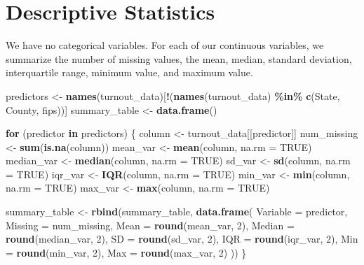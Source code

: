 \documentclass[
]{article}
\newenvironment{Shaded}{\begin{snugshade}}{\end{snugshade}}
\newcommand{\AttributeTok}[1]{\textcolor[rgb]{0.13,0.29,0.53}{#1}}
\newcommand{\ConstantTok}[1]{\textcolor[rgb]{0.56,0.35,0.01}{#1}}
\newcommand{\ControlFlowTok}[1]{\textcolor[rgb]{0.13,0.29,0.53}{\textbf{#1}}}
\newcommand{\DecValTok}[1]{\textcolor[rgb]{0.00,0.00,0.81}{#1}}
\newcommand{\FunctionTok}[1]{\textcolor[rgb]{0.13,0.29,0.53}{\textbf{#1}}}
\newcommand{\NormalTok}[1]{#1}
\newcommand{\OtherTok}[1]{\textcolor[rgb]{0.56,0.35,0.01}{#1}}
\newcommand{\SpecialCharTok}[1]{\textcolor[rgb]{0.81,0.36,0.00}{\textbf{#1}}}
\newcommand{\StringTok}[1]{\textcolor[rgb]{0.31,0.60,0.02}{#1}}
\begin{document}
\section{Descriptive Statistics}\label{descriptive-statistics}

We have no categorical variables. For each of our continuous variables,
we summarize the number of missing values, the mean, median, standard
deviation, interquartile range, minimum value, and maximum value.

\begin{Shaded}
\begin{Highlighting}[]
\NormalTok{predictors }\OtherTok{\textless{}{-}} \FunctionTok{names}\NormalTok{(turnout\_data)[}\SpecialCharTok{!}\NormalTok{(}\FunctionTok{names}\NormalTok{(turnout\_data) }\SpecialCharTok{\%in\%} \FunctionTok{c}\NormalTok{(}\StringTok{\textquotesingle{}State\textquotesingle{}}\NormalTok{, }\StringTok{\textquotesingle{}County\textquotesingle{}}\NormalTok{, }\StringTok{\textquotesingle{}fips\textquotesingle{}}\NormalTok{))]}
\NormalTok{summary\_table }\OtherTok{\textless{}{-}} \FunctionTok{data.frame}\NormalTok{()}

\ControlFlowTok{for}\NormalTok{ (predictor }\ControlFlowTok{in}\NormalTok{ predictors) \{}
\NormalTok{  column }\OtherTok{\textless{}{-}}\NormalTok{ turnout\_data[[predictor]]}
\NormalTok{  num\_missing }\OtherTok{\textless{}{-}} \FunctionTok{sum}\NormalTok{(}\FunctionTok{is.na}\NormalTok{(column))}
\NormalTok{  mean\_var }\OtherTok{\textless{}{-}} \FunctionTok{mean}\NormalTok{(column, }\AttributeTok{na.rm =} \ConstantTok{TRUE}\NormalTok{)}
\NormalTok{  median\_var }\OtherTok{\textless{}{-}} \FunctionTok{median}\NormalTok{(column, }\AttributeTok{na.rm =} \ConstantTok{TRUE}\NormalTok{)}
\NormalTok{  sd\_var }\OtherTok{\textless{}{-}} \FunctionTok{sd}\NormalTok{(column, }\AttributeTok{na.rm =} \ConstantTok{TRUE}\NormalTok{)}
\NormalTok{  iqr\_var }\OtherTok{\textless{}{-}} \FunctionTok{IQR}\NormalTok{(column, }\AttributeTok{na.rm =} \ConstantTok{TRUE}\NormalTok{)}
\NormalTok{  min\_var }\OtherTok{\textless{}{-}} \FunctionTok{min}\NormalTok{(column, }\AttributeTok{na.rm =} \ConstantTok{TRUE}\NormalTok{)}
\NormalTok{  max\_var }\OtherTok{\textless{}{-}} \FunctionTok{max}\NormalTok{(column, }\AttributeTok{na.rm =} \ConstantTok{TRUE}\NormalTok{)}

\NormalTok{  summary\_table }\OtherTok{\textless{}{-}} \FunctionTok{rbind}\NormalTok{(summary\_table, }\FunctionTok{data.frame}\NormalTok{(}
    \AttributeTok{Variable =}\NormalTok{ predictor,}
    \AttributeTok{Missing =}\NormalTok{ num\_missing,}
    \AttributeTok{Mean =} \FunctionTok{round}\NormalTok{(mean\_var, }\DecValTok{2}\NormalTok{),}
    \AttributeTok{Median =} \FunctionTok{round}\NormalTok{(median\_var, }\DecValTok{2}\NormalTok{),}
    \AttributeTok{SD =} \FunctionTok{round}\NormalTok{(sd\_var, }\DecValTok{2}\NormalTok{),}
    \AttributeTok{IQR =} \FunctionTok{round}\NormalTok{(iqr\_var, }\DecValTok{2}\NormalTok{),}
    \AttributeTok{Min =} \FunctionTok{round}\NormalTok{(min\_var, }\DecValTok{2}\NormalTok{),}
    \AttributeTok{Max =} \FunctionTok{round}\NormalTok{(max\_var, }\DecValTok{2}\NormalTok{)}
\NormalTok{  ))}
\NormalTok{\}}


\end{Highlighting}
\end{Shaded}
\end{document}
